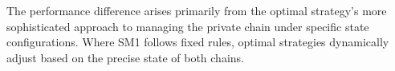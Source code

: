 \documentclass[conference]{IEEEtran}
\begin{document}
The performance difference arises primarily from the optimal strategy's more sophisticated approach to managing the private chain under specific state configurations. Where SM1 follows fixed rules, optimal strategies dynamically adjust based on the precise state of both chains.



    
    
    


\end{document}
